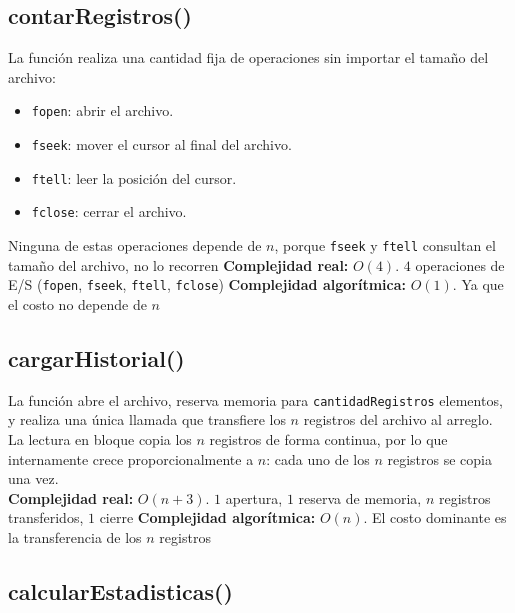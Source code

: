 \documentclass[12pt,letterpaper]{article}
\begin{document}
\subsection{contarRegistros()}

La función realiza una cantidad fija de operaciones sin importar el tamaño del archivo: 
\begin{itemize}
    \item \texttt{fopen}: abrir el archivo.
    \item \texttt{fseek}: mover el cursor al final del archivo.
    \item \texttt{ftell}: leer la posición del cursor.
    \item \texttt{fclose}: cerrar el archivo.
\end{itemize}
Ninguna de estas operaciones depende de $n$, porque \texttt{fseek} y \texttt{ftell} consultan el tamaño del archivo, no lo recorren
\newline \newline
\textbf{Complejidad real:} $O(4)$. $4$ operaciones de E/S (\texttt{fopen}, \texttt{fseek}, \texttt{ftell}, \texttt{fclose})
\newline
\textbf{Complejidad algorítmica:} $O(1)$. Ya que el costo no depende de $n$

\subsection{cargarHistorial()}

La función abre el archivo, reserva memoria para \texttt{cantidadRegistros} elementos, y realiza una única llamada que transfiere los $n$ registros del archivo al arreglo. 
La lectura en bloque copia los $n$ registros de forma continua, por lo que internamente crece proporcionalmente a $n$: cada uno de los $n$ registros se copia una vez.
\\[0.6cm]
\textbf{Complejidad real:} $O(n + 3)$. $1$ apertura, $1$ reserva de memoria, $n$ registros transferidos, $1$ cierre
\newline
\textbf{Complejidad algorítmica:} $O(n)$. El costo dominante es la transferencia de los $n$ registros

\subsection{calcularEstadisticas()}
\end{document}
